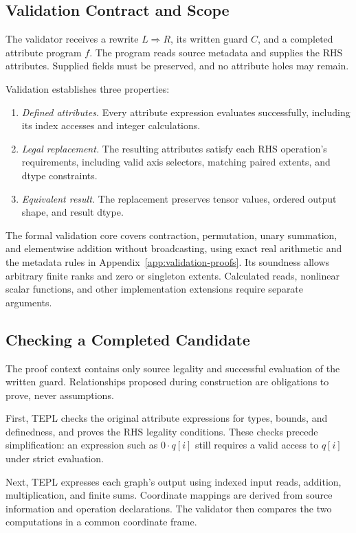 \subsection{Validation Contract and Scope}
\label{sec:validation-boundary}
The validator receives a rewrite $L\Rightarrow R$, its written guard
$C$, and a completed attribute program $f$. The program reads source
metadata and supplies the RHS attributes. Supplied fields must be
preserved, and no attribute holes may remain.

Validation establishes three properties:
\begin{enumerate}
\item \emph{Defined attributes.}
Every attribute expression evaluates successfully, including its
index accesses and integer calculations.
\item \emph{Legal replacement.}
The resulting attributes satisfy each RHS operation's requirements,
including valid axis selectors, matching paired extents, and dtype
constraints.
\item \emph{Equivalent result.}
The replacement preserves tensor values, ordered output shape, and
result dtype.
\end{enumerate}

The formal validation core covers contraction, permutation, unary
summation, and elementwise addition without broadcasting, using exact
real arithmetic and the metadata rules in
Appendix~\ref{app:validation-proofs}. Its soundness allows arbitrary
finite ranks and zero or singleton extents. Calculated reads,
nonlinear scalar functions, and other implementation extensions
require separate arguments.

\subsection{Checking a Completed Candidate}
\label{sec:validation-algorithm}
The proof context contains only source legality and successful
evaluation of the written guard. Relationships proposed during
construction are obligations to prove, never assumptions.

First, TEPL checks the original attribute expressions for types,
bounds, and definedness, and proves the RHS legality conditions.
These checks precede simplification: an expression such as
$0\cdot q[i]$ still requires a valid access to $q[i]$ under strict
evaluation.

Next, TEPL expresses each graph's output using indexed input reads,
addition, multiplication, and finite sums. Coordinate mappings are
derived from source information and operation declarations. The
validator then compares the two computations in a common coordinate
frame.

